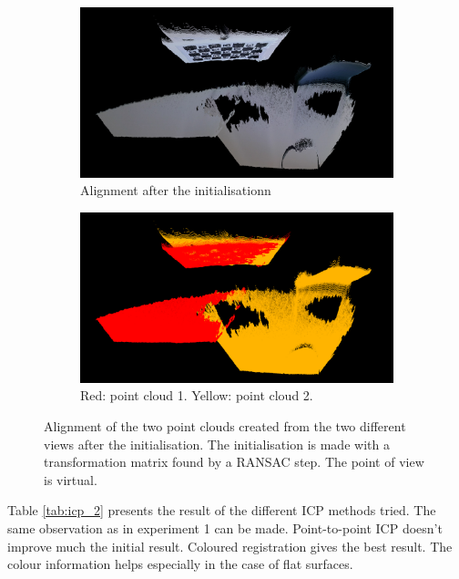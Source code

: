 \begin{figure}[H]
\centering
  \begin{subfigure}[b]{0.48 \textwidth}
    \includegraphics[width=\textwidth]{images/registration/init_ransac_crop_RGB.png}
    \caption{Alignment after the initialisationn}
    \label{figure:init_ransac_crop_RGB}
  \end{subfigure}
  \hfill
  \begin{subfigure}[b]{0.48 \textwidth}
    \includegraphics[width=\textwidth]{images/registration/init_ransac_crop_colour.png}
    \caption{Red: point cloud 1. Yellow: point cloud 2.}
    \label{figure:init_ransac_crop_colour}
  \end{subfigure}
  \caption{Alignment of the two point clouds created from the two different views after the initialisation. The initialisation is made with a transformation matrix found by a RANSAC step. The point of view is virtual.}
  \label{figure:init_ransac_crop}
\end{figure}

Table \ref{tab:icp_2} presents the result of the different ICP methods tried. The same observation as in experiment 1 can be made. Point-to-point ICP doesn't improve much the initial result. Coloured registration gives the best result. The colour information helps especially in the case of flat surfaces. 

